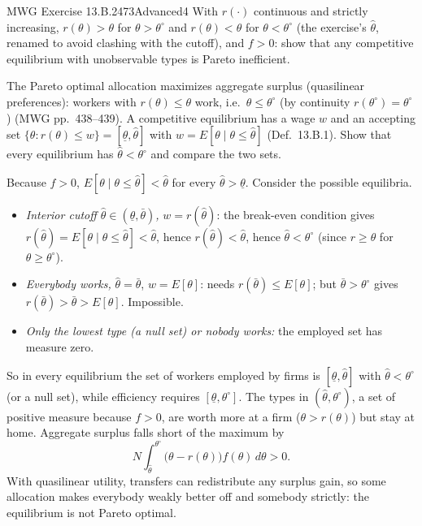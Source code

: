 \begin{exsol}{MWG Exercise 13.B.2}{473}{Advanced}{4}
\asked With $r(\cdot)$ continuous and strictly increasing, $r(\theta)>\theta$ for $\theta>\theta^\circ$ and
$r(\theta)<\theta$ for $\theta<\theta^\circ$ (the exercise's $\hat\theta$, renamed to avoid clashing
with the cutoff), and $f>0$: show that any competitive equilibrium with unobservable types is
Pareto inefficient.

\method The Pareto optimal allocation maximizes aggregate surplus (quasilinear preferences):
workers with $r(\theta)\le\theta$ work, i.e.\ $\theta\le\theta^\circ$ (by continuity $r(\theta^\circ)=\theta^\circ$)
(MWG pp.~438--439). A competitive equilibrium has a wage $w$ and an accepting set
$\{\theta:r(\theta)\le w\}=[\underline\theta,\hat\theta]$ with $w=E[\theta\mid\theta\le\hat\theta]$ (Def.~13.B.1).
Show that every equilibrium has $\hat\theta<\theta^\circ$ and compare the two sets.

\solution
Because $f>0$, $E[\theta\mid\theta\le\hat\theta]<\hat\theta$ for every $\hat\theta>\underline\theta$. Consider
the possible equilibria.
\begin{itemize}
  \item \emph{Interior cutoff $\hat\theta\in(\underline\theta,\bar\theta)$,} $w=r(\hat\theta)$: the break-even condition gives
  $r(\hat\theta)=E[\theta\mid\theta\le\hat\theta]<\hat\theta$, hence $r(\hat\theta)<\hat\theta$, hence
  $\hat\theta<\theta^\circ$ (since $r\ge\theta$ for $\theta\ge\theta^\circ$).
  \item \emph{Everybody works,} $\hat\theta=\bar\theta$, $w=E[\theta]$: needs $r(\bar\theta)\le E[\theta]$; but
  $\bar\theta>\theta^\circ$ gives $r(\bar\theta)>\bar\theta>E[\theta]$. Impossible.
  \item \emph{Only the lowest type (a null set) or nobody works:} the employed set has measure zero.
\end{itemize}
So in every equilibrium the set of workers employed by firms is $[\underline\theta,\hat\theta]$ with
$\hat\theta<\theta^\circ$ (or a null set), while efficiency requires $[\underline\theta,\theta^\circ]$.
The types in $(\hat\theta,\theta^\circ)$, a set of positive measure because $f>0$, are worth more at
a firm ($\theta>r(\theta)$) but stay at home. Aggregate surplus falls short of the maximum by
\[
  N\int_{\hat\theta}^{\theta^\circ}\bigl(\theta-r(\theta)\bigr)f(\theta)\,d\theta>0 .
\]
With quasilinear utility, transfers can redistribute any surplus gain, so some allocation makes
everybody weakly better off and somebody strictly: the equilibrium is not Pareto optimal.


\end{exsol}
